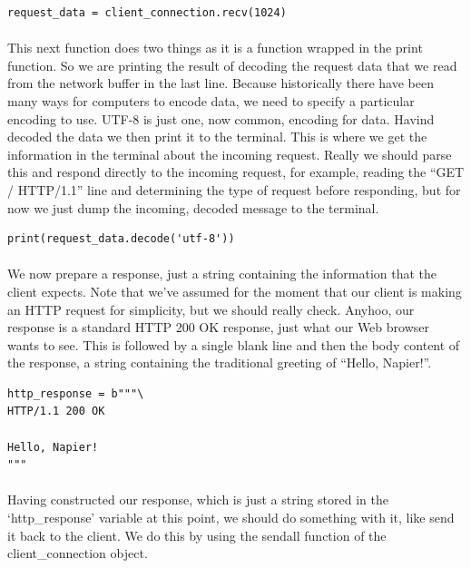 \begin{lstlisting}[style=CODE]
request_data = client_connection.recv(1024)
\end{lstlisting}

\paragraph{} This next function does two things as it is a function wrapped in the print function. So we are printing the result of decoding the request data that we read from the network buffer in the last line. Because historically there have been many ways for computers to encode data, we need to specify a particular encoding to use. UTF-8 is just one, now common, encoding for data. Havind decoded the data we then print it to the terminal. This is where we get the information in the terminal about the incoming request. Really we should parse this and respond directly to the incoming request, for example, reading the ``GET / HTTP/1.1'' line and determining the type of request before responding, but for now we just dump the incoming, decoded message to the terminal.

\begin{lstlisting}[style=CODE]
print(request_data.decode('utf-8'))
\end{lstlisting}

\paragraph{} We now prepare a response, just a string containing the information that the client expects. Note that we've assumed for the moment that our client is making an HTTP request for simplicity, but we should really check. Anyhoo, our response is a standard HTTP 200 OK response, just what our Web browser wants to see. This is followed by a single blank line and then the body content of the response, a string containing the traditional greeting of ``Hello, Napier!''.

\begin{lstlisting}[style=CODE]
http_response = b"""\
HTTP/1.1 200 OK

Hello, Napier!
"""
\end{lstlisting}

\paragraph{} Having constructed our response, which is just a string stored in the `http\_response' variable at this point, we should do something with it, like send it back to the client. We do this by using the sendall function of the client\_connection object.

